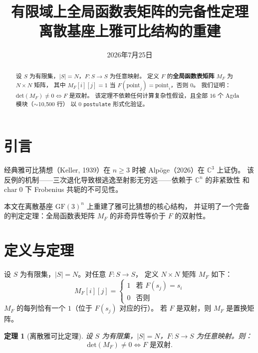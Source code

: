 \documentclass[a4paper,11pt]{article}
\newtheorem{theorem}{定理}
\newcommand{\GF}{\mathrm{GF}}
\newcommand{\MF}{M_F}
\newcommand{\Det}{\mathrm{det}}
\begin{document}
\title{\textbf{有限域上全局函数表矩阵的完备性定理}\\[4pt]
\large 离散基座上雅可比结构的重建}
\author{}
\date{2026年7月25日}

\maketitle

\begin{abstract}
设 $S$ 为有限集，$|S|=N$，$F: S \to S$ 为任意映射。
定义 $F$ 的\textbf{全局函数表矩阵} $\MF$ 为 $N \times N$ 矩阵，
其中 $\MF[i][j] = 1$ 当 $F(\text{point}_j) = \text{point}_i$，否则 $0$。
我们证明：$\Det(\MF) \neq 0 \iff F$ 是双射。
该定理不依赖任何计算复杂性假设，且全部 $16$ 个 Agda 模块（$\sim$10,500 行）
以 $0$ \texttt{postulate} 形式化验证。
\end{abstract}

\section{引言}

经典雅可比猜想（Keller, 1939）在 $n \geq 3$ 时被 Alp\"{o}ge（2026）在 $\mathbb{C}^3$ 上证伪。
该反例的机制——三次退化导致根逃逸至射影无穷远——依赖于 $\mathbb{C}^n$ 的非紧致性
和 $\text{char}\;0$ 下 Frobenius 共轭的不可见性。

本文在离散基座 $\GF(3)^n$ 上重建了雅可比猜想的核心结构，
并证明了一个完备的判定定理：全局函数表矩阵 $\MF$ 的非奇异性等价于 $F$ 的双射性。

\section{定义与定理}

\begin{definition}[函数表矩阵]
设 $S$ 为有限集，$|S|=N$。对任意 $F: S \to S$，
定义 $N \times N$ 矩阵 $\MF$ 如下：
\[
\MF[i][j] = \begin{cases}
1 & \text{若 } F(s_j) = s_i \\
0 & \text{否则}
\end{cases}
\]
$\MF$ 的每列恰有一个 $1$（位于 $F(s_j)$ 对应的行）。
若 $F$ 是双射，则 $\MF$ 是置换矩阵。
\end{definition}

\begin{theorem}[离散雅可比定理]
设 $S$ 为有限集，$|S|=N$，$F: S \to S$ 为任意映射。则：
\[
\Det(\MF) \neq 0 \iff F \text{ 是双射}.
\]
\end{theorem}
\end{document}
